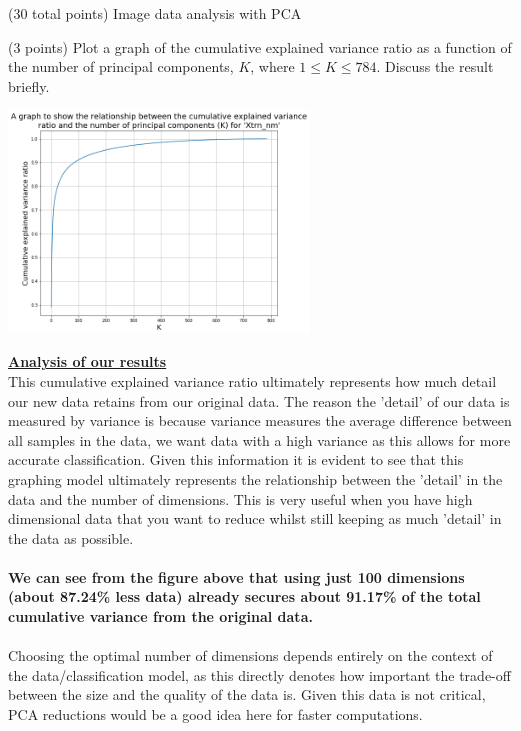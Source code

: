 \documentclass[12pt]{article}
\begin{document}
\begin{question}{(30 total points) Image data analysis with PCA}
\begin{subquestion}{(3 points)
       Plot a graph of the cumulative explained variance ratio as a function of the number of principal components, $K$, where $1\le K \le 784$.
       Discuss the result briefly.
     }
      \begin{answerbox}{30em}
        \begin{center}
         \includegraphics[width=0.6\textwidth]{images/q14.png}
        \end{center}
        \scriptsize{
        \textbf{\footnotesize{\underline{Analysis of our results}}}\\
        This cumulative explained variance ratio ultimately represents how much detail our new data retains from our original data. The reason the 'detail' of our data is measured by variance is because variance measures the average difference between all samples in the data, we want data with a high variance as this allows for more accurate classification. Given this information it is evident to see that this graphing model ultimately represents the relationship between the 'detail' in the data and the number of dimensions. This is very useful when you have high dimensional data that you want to reduce whilst still keeping as much 'detail' in the data as possible.\\
\\
        \textbf{We can see from the figure above that using just 100 dimensions (about 87.24\% less data) already secures about 91.17\% of the total cumulative variance from the original data.}\\
\\
        Choosing the optimal number of dimensions depends entirely on the context of the data/classification model, as this directly denotes how important the trade-off between the size and the quality of the data is. Given this data is not critical, PCA reductions would be a good idea here for faster computations.%
        }
      \end{answerbox}
  



\end{subquestion}
\end{question}
\end{document}
